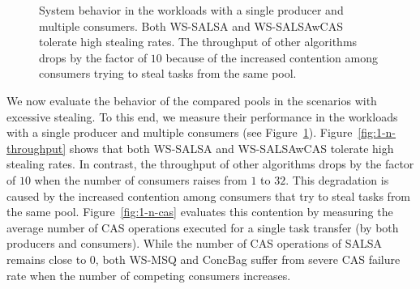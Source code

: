 \begin{figure}[htb]
	\centering
	\caption{\footnotesize{System behavior in the workloads with a single producer and multiple consumers. 
	Both WS-SALSA and WS-SALSAwCAS tolerate high stealing rates. The throughput of other algorithms drops by the factor of $10$ because of the increased contention among consumers trying to steal tasks from the same pool.}}
	\label{fig:1-n-perf}
\end{figure}

We now evaluate the behavior of the compared pools in the scenarios with excessive stealing. To this end, we measure their performance in the workloads with a single producer and multiple consumers (see Figure~\ref{fig:1-n-perf}). 
Figure~\ref{fig:1-n-throughput} shows that both WS-SALSA and WS-SALSAwCAS tolerate high stealing rates. In contrast, the throughput of other algorithms drops by the factor of $10$ when the number of consumers raises from $1$ to $32$. 
This degradation is caused by the increased contention among consumers that try to steal tasks from the same pool. 
Figure~\ref{fig:1-n-cas} evaluates this contention by measuring the average number of CAS operations executed for a single task transfer (by both producers and consumers). While the number of CAS operations of SALSA remains close to $0$, both WS-MSQ and ConcBag suffer from severe CAS failure rate when the number of competing consumers increases. 

